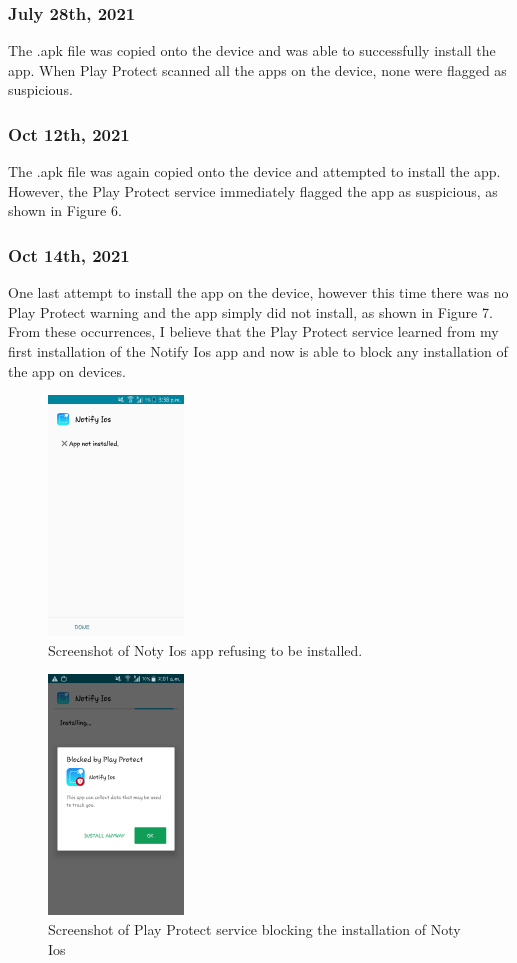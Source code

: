 \documentclass[conference]{IEEEtran}
\begin{document}
\subsubsection{July 28th, 2021}
The .apk file was copied onto the device
and was able to successfully install the app.
When Play Protect scanned all the apps on
the device, none were flagged as suspicious.
\newpage


\subsubsection{Oct 12th, 2021}
The .apk file was again copied onto the device and attempted to install the app. However, the Play Protect service immediately flagged the app as suspicious, as shown in Figure 6.
\subsubsection{Oct 14th, 2021}
One last attempt to install the app on the device, however this time there was no Play Protect warning and the app simply did not install, as shown in Figure 7. From these occurrences, I believe that the Play Protect service learned from my first installation of the Notify Ios app and now is able to block any installation of the app on devices.
\begin{figure}
    \centering
    \includegraphics{fig7.png}
    \caption{Screenshot of Noty Ios app refusing to be installed.}
    \label{fig:my_label}
\end{figure}
\begin{figure}
    \centering
    \includegraphics{fig6.png}
    \caption{Screenshot of Play Protect service blocking the installation of Noty Ios}
    \label{fig:my_label}
\end{figure}
\end{document}

